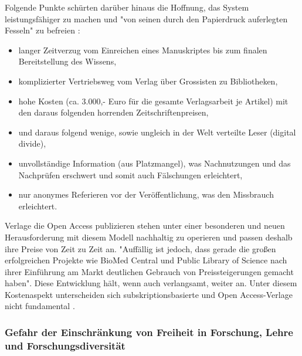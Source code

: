 Folgende Punkte schürten darüber hinaus die Hoffnung, das System leistungsfähiger zu machen und "von seinen durch den Papierdruck auferlegten Fesseln" zu befreien \cite{hilf_2004}:
\begin{itemize}
\item langer Zeitverzug vom Einreichen eines Manuskriptes bis zum finalen Bereitstellung des Wissens,
\item komplizierter Vertriebsweg vom Verlag über Grossisten zu Bibliotheken,
\item hohe Kosten (ca. 3.000,- Euro für die gesamte Verlagsarbeit je Artikel) mit den daraus folgenden horrenden Zeitschriftenpreisen,
\item und daraus folgend wenige, sowie ungleich in der Welt verteilte Leser (digital divide),
\item unvollständige Information (aus Platzmangel), was Nachnutzungen und das Nachprüfen erschwert und somit auch Fälschungen erleichtert,
\item nur anonymes Referieren vor der Veröffentlichung, was den Missbrauch erleichtert.
\end{itemize}

Verlage die Open Access publizieren stehen unter einer besonderen und neuen Herausforderung mit diesem Modell nachhaltig zu operieren und passen deshalb ihre Preise von Zeit zu Zeit an. "Auffällig ist jedoch, dass gerade die großen erfolgreichen Projekte wie BioMed Central und Public Library of Science nach ihrer Einführung am Markt deutlichen Gebrauch von Preissteigerungen gemacht haben"\cite{schmidt_2007_goldenen}. Diese Entwicklung hält, wenn auch verlangsamt, weiter an\cite{suchen}. Unter diesem Kostenaspekt unterscheiden sich subskriptionsbasierte und Open Access-Verlage nicht fundamental \cite{schmidt_2007_goldenen}.

\subsubsection{Gefahr der Einschränkung von Freiheit in Forschung, Lehre und Forschungsdiversität}

